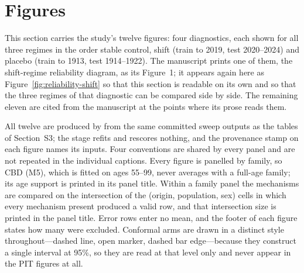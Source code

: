 %

\clearpage
\section{Figures}
\label{sec:supp-figures}

This section carries the study's twelve figures: four diagnostics, each shown
for all three regimes in the order stable control, shift (train to 2019, test
2020--2024) and placebo (train to 1913, test 1914--1922). The manuscript prints
one of them, the shift-regime reliability diagram, as its Figure~1; it appears
again here as Figure~\ref{fig:reliability-shift} so that this section is
readable on its own and so that the three regimes of that diagnostic can be
compared side by side. The remaining eleven are cited from the manuscript at
the points where its prose reads them.

All twelve are produced by  from the same
committed sweep outputs as the tables of Section~S3; the stage refits and
rescores nothing, and the provenance stamp on each figure names its inputs.
Four conventions are shared by every panel and are not repeated in the
individual captions. Every figure is panelled by family, so CBD (M5), which is
fitted on ages 55--99, never averages with a full-age family; its age support
is printed in its panel title. Within a family panel the mechanisms are
compared on the intersection of the (origin, population, sex) cells in which
every mechanism present produced a valid row, and that intersection size is
printed in the panel title. Error rows enter no mean, and the footer of each
figure states how many were excluded. Conformal arms are drawn in a distinct
style throughout---dashed line, open marker, dashed bar edge---because they
construct a single interval at 95\%, so they are read at that level only and
never appear in the PIT figures at all.

